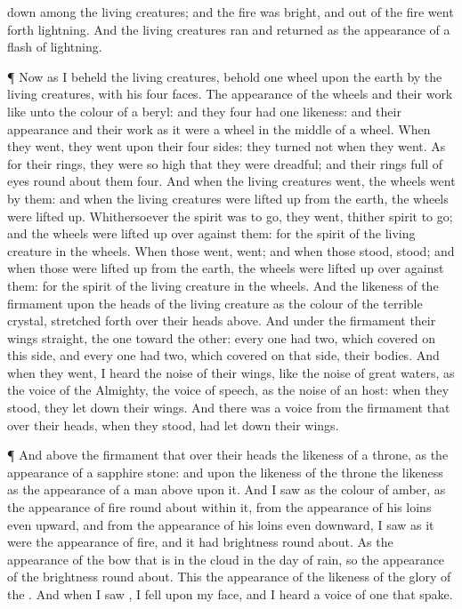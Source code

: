 {down among the living
creatures; and the
fire was
bright, and out of the
fire went
forth
lightning.
And the living
creatures
ran and
returned as the
appearance of a flash of
lightning.
\par }{\PP {}¶ Now as I
beheld the living
creatures, behold
one
wheel upon the
earth
by the living
creatures, with his
four
faces.
The
appearance of the
wheels and their
work
{} like unto the
colour of a
beryl: and they
four had
one
likeness: and their
appearance and their
work
{} as it were a
wheel in the
middle of a
wheel.
When they
went, they
went upon their
four
sides:
{} they
turned not when they
went.
As for their
rings, they were so
high that they were
dreadful; and their
rings
{}
full of
eyes round
about them
four.
And when the living
creatures
went, the
wheels
went by
them: and when the living
creatures were lifted
up from the
earth, the
wheels were lifted
up.
Whithersoever the
spirit was to
go, they
went, thither
{}
spirit to
go; and the
wheels were lifted
up over
against them: for the
spirit of the living
creature
{} in the
wheels.
When those
went,
{}
went; and when those
stood,
{}
stood; and when those were lifted
up from the
earth, the
wheels were lifted
up over
against them: for the
spirit of the living
creature
{} in the
wheels.
And the
likeness of the
firmament upon the
heads of the living
creature
{} as the
colour of the
terrible
crystal, stretched
forth over their
heads
above.
And under the
firmament
{} their
wings
straight, the
one toward the
other: every
one had
two, which
covered on this
side, and every
one had
two, which
covered on that
side, their
bodies.
And when they
went, I
heard the
noise of their
wings, like the
noise of
great
waters, as the
voice of the
Almighty, the
voice of
speech, as the
noise of an
host: when they
stood, they let
down their
wings.
And there was a
voice from the
firmament that
{} over their
heads, when they
stood,
{} had let
down their
wings.
\par }{\PP {}¶ And
above the
firmament that
{} over their
heads
{} the
likeness of a
throne, as the
appearance of a
sapphire
stone: and upon the
likeness of the
throne
{} the
likeness as the
appearance of a
man
above upon it.
And I
saw as the
colour of
amber, as the
appearance of
fire round
about
within it, from the
appearance of his
loins even
upward, and from the
appearance of his
loins even
downward, I
saw as it were the
appearance of
fire, and it had
brightness round
about.
As the
appearance of the
bow that is in the
cloud in the
day of
rain, so
{} the
appearance of the
brightness round
about. This
{} the
appearance of the
likeness of the
glory of the
{}. And when I
saw
{}, I
fell upon my
face, and I
heard a
voice of one that
spake.

}
